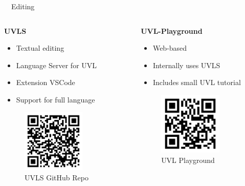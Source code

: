 \documentclass[
	aspectratio=169, %
	8pt, %
	nosectionframes, %
]{beamer}
\newcommand{\inlinesubtitle}[1]{\textcolor{gray!60}{~{}~#1}}
\begin{document}
\begin{frame}{\insertsection \inlinesubtitle{Editing}}
    	\begin{columns}[t]
		\begin{column}{0.3\textwidth}
            \textbf{UVLS}
			\begin{itemize}
                    \item Textual editing
                    \item Language Server for UVL
                    \item Extension VSCode
                    \item Support for full language
			\end{itemize}
            \begin{figure}
                \centering
                \includegraphics[width=3cm]{pics/qr/uvls.pdf}
                \caption{UVLS GitHub Repo}
            \end{figure}

		\end{column}
  		\begin{column}{0.3\textwidth}
            \textbf{UVL-Playground}
			\begin{itemize}
                    \item Web-based
                    \item Internally uses UVLS
                    \item Includes small UVL tutorial
			\end{itemize}
   			            \begin{figure}
                \centering
                \includegraphics[width=3cm]{pics/qr/uvlplayground.pdf}
                \caption{UVL Playground}
            \end{figure}


\end{column}
\end{columns}
\end{frame}
\end{document}
